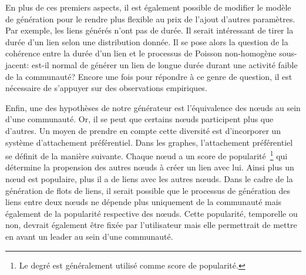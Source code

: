 En plus de ces premiers aspects, il est également possible de modifier le modèle de génération pour le rendre plus flexible au prix de l'ajout d'autres paramètres.
Par exemple, les liens générés n'ont pas de durée.
Il serait intéressant de tirer la durée d'un lien selon une distribution donnée.
Il se pose alors la question de la cohérence entre la durée d'un lien et le processus de Poisson non-homogène sous-jacent: est-il normal de générer un lien de longue durée durant une activité faible de la communauté?
Encore une fois pour répondre à ce genre de question, il est nécessaire de s'appuyer sur des observations empiriques.

Enfin, une des hypothèses de notre générateur est l'équivalence des n\oe{}uds au sein d'une communauté.
Or, il se peut que certains n\oe{}uds participent plus que d'autres.
Un moyen de prendre en compte cette diversité est d'incorporer un système d'attachement préférentiel.
Dans les graphes, l'attachement préférentiel se définit de la manière suivante.
Chaque n\oe{}ud a un score de popularité~\footnote{Le degré est généralement utilisé comme score de popularité.} qui détermine la propension des autres n\oe{}uds à créer un lien avec lui.
Ainsi plus un n\oe{}ud est populaire, plus il a de liens avec les autres n\oe{}uds.
Dans le cadre de la génération de flots de liens, il serait possible que le processus de génération des liens entre deux n\oe{}uds ne dépende plus uniquement de la communauté mais également de la popularité respective des n\oe{}uds.
Cette popularité, temporelle ou non, devrait également être fixée par l'utilisateur mais elle permettrait de mettre en avant un leader au sein d'une communauté.





